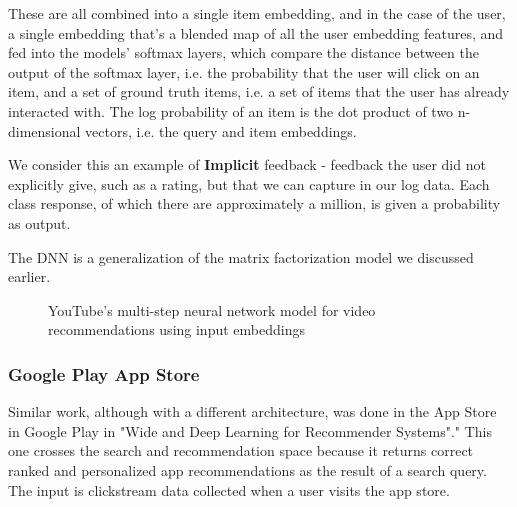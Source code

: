 \documentclass[11pt, table]{diazessay} %
\begin{document}
\begin{sloppypar}
These are all combined into a single item embedding, and in the case of the user, a single embedding that's a blended map of all the user embedding features, and fed into the models' softmax layers, which compare the distance between the output of the softmax layer, i.e. the probability that the user will click on an item, and a set of ground truth items, i.e. a set of items that the user has already interacted with. The log probability of an item is the dot product of two n-dimensional vectors, i.e. the query and item embeddings. 

We consider this an example of \textbf{Implicit} feedback - feedback the user did not explicitly give, such as a rating, but that we can capture in our log data.  Each class response, of which there are approximately a million, is given a probability as output.  

The DNN is a generalization of the matrix factorization model we discussed earlier. 


\begin{figure}[H]
\caption{YouTube's multi-step neural network model for video recommendations using input embeddings\citep{covington2016deep}}
\end{figure}

\subsubsection*{Google Play App Store}
Similar work, although with a different architecture, was done in the App Store in Google Play in "Wide and Deep Learning for Recommender Systems"\citep{cheng2016wide}." This one crosses the search and recommendation space because it returns correct ranked and personalized app recommendations as the result of a search query.  The input is clickstream  data collected when a user visits the app store.



\end{sloppypar}
\end{document}
